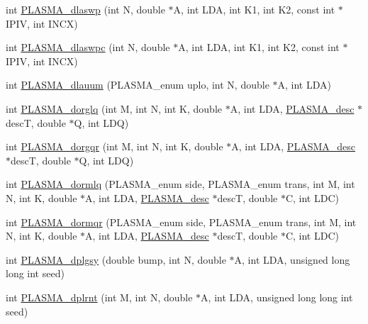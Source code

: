 \begin{DoxyCompactItemize}
\item 
int \hyperlink{group__double_ga2f62c99800ab0165fa0fb2c58cb2869a_ga2f62c99800ab0165fa0fb2c58cb2869a}{P\+L\+A\+S\+M\+A\+\_\+dlaswp} (int N, double $\ast$A, int L\+D\+A, int K1, int K2, const int $\ast$I\+P\+I\+V, int I\+N\+C\+X)
\item 
int \hyperlink{group__double_gaf05cd57bcd5a74823cc4f71d91a299bc_gaf05cd57bcd5a74823cc4f71d91a299bc}{P\+L\+A\+S\+M\+A\+\_\+dlaswpc} (int N, double $\ast$A, int L\+D\+A, int K1, int K2, const int $\ast$I\+P\+I\+V, int I\+N\+C\+X)
\item 
int \hyperlink{group__double_ga67ff8abfce111a501fb5cec37333756f_ga67ff8abfce111a501fb5cec37333756f}{P\+L\+A\+S\+M\+A\+\_\+dlauum} (P\+L\+A\+S\+M\+A\+\_\+enum uplo, int N, double $\ast$A, int L\+D\+A)
\item 
int \hyperlink{group__double_gae71a8dbbe843b68aca052074db93409d_gae71a8dbbe843b68aca052074db93409d}{P\+L\+A\+S\+M\+A\+\_\+dorglq} (int M, int N, int K, double $\ast$A, int L\+D\+A, \hyperlink{structplasma__desc__t}{P\+L\+A\+S\+M\+A\+\_\+desc} $\ast$desc\+T, double $\ast$Q, int L\+D\+Q)
\item 
int \hyperlink{group__double_ga5137c6e07ebf2faddae220daa28999ba_ga5137c6e07ebf2faddae220daa28999ba}{P\+L\+A\+S\+M\+A\+\_\+dorgqr} (int M, int N, int K, double $\ast$A, int L\+D\+A, \hyperlink{structplasma__desc__t}{P\+L\+A\+S\+M\+A\+\_\+desc} $\ast$desc\+T, double $\ast$Q, int L\+D\+Q)
\item 
int \hyperlink{group__double_ga7c70d5b53e69f9ab564126c78938002a_ga7c70d5b53e69f9ab564126c78938002a}{P\+L\+A\+S\+M\+A\+\_\+dormlq} (P\+L\+A\+S\+M\+A\+\_\+enum side, P\+L\+A\+S\+M\+A\+\_\+enum trans, int M, int N, int K, double $\ast$A, int L\+D\+A, \hyperlink{structplasma__desc__t}{P\+L\+A\+S\+M\+A\+\_\+desc} $\ast$desc\+T, double $\ast$C, int L\+D\+C)
\item 
int \hyperlink{group__double_ga9623493d89eb656c0f5aa44c7772294c_ga9623493d89eb656c0f5aa44c7772294c}{P\+L\+A\+S\+M\+A\+\_\+dormqr} (P\+L\+A\+S\+M\+A\+\_\+enum side, P\+L\+A\+S\+M\+A\+\_\+enum trans, int M, int N, int K, double $\ast$A, int L\+D\+A, \hyperlink{structplasma__desc__t}{P\+L\+A\+S\+M\+A\+\_\+desc} $\ast$desc\+T, double $\ast$C, int L\+D\+C)
\item 
int \hyperlink{group__double_ga267c9f85256181c2024279e1dc55e84b_ga267c9f85256181c2024279e1dc55e84b}{P\+L\+A\+S\+M\+A\+\_\+dplgsy} (double bump, int N, double $\ast$A, int L\+D\+A, unsigned long long int seed)
\item 
int \hyperlink{group__double_gafca5b7ac3183e0a107df9f88ecde4cdf_gafca5b7ac3183e0a107df9f88ecde4cdf}{P\+L\+A\+S\+M\+A\+\_\+dplrnt} (int M, int N, double $\ast$A, int L\+D\+A, unsigned long long int seed)

\end{DoxyCompactItemize}
